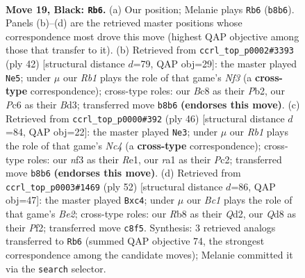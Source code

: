 \documentclass[11pt]{article}
\begin{document}
\clearpage

\begin{figure}[p]\centering
\begin{subfigure}{0.46\textwidth}\centering
\resizebox{\linewidth}{!}{%
\newchessgame
\chessboard[
  setfen={1rbqrk2/Q1p2p1p/P1pp1n2/8/2P1P3/5N2/2P2PP1/R1B2RK1 b - - 0 19},
  showmover=false,
  pgfstyle=straightmove, color=movearrow, markmove={b8-b6}
]}
\caption{}
\end{subfigure}\hfill
\begin{subfigure}{0.46\textwidth}\centering
\resizebox{\linewidth}{!}{%
\newchessgame
\chessboard[
  setfen={r4k1r/p2b1p2/2p1pn2/5p1p/3P3P/3B1Nq1/PPQ3P1/K2RR3 w - - 6 22},
  showmover=false,
  pgfstyle=straightmove, color=movearrow, markmove={f3-e5}
]}
\caption{}
\end{subfigure}
\\[4pt]
\begin{subfigure}{0.46\textwidth}\centering
\resizebox{\linewidth}{!}{%
\newchessgame
\chessboard[
  setfen={2b2r1k/pr2p2p/2p2p2/3q1p2/2NP4/2P5/P1PQ2PP/4RRK1 w - - 1 24},
  showmover=false,
  pgfstyle=straightmove, color=movearrow, markmove={c4-e3}
]}
\caption{}
\end{subfigure}\hfill
\begin{subfigure}{0.46\textwidth}\centering
\resizebox{\linewidth}{!}{%
\newchessgame
\chessboard[
  setfen={2r1r1k1/4ppbp/1q1p2p1/R2P4/1PnN4/7P/3QBPP1/3R2K1 w - - 1 27},
  showmover=false,
  pgfstyle=straightmove, color=movearrow, markmove={e2-c4}
]}
\caption{}
\end{subfigure}
\caption{\textbf{Move 19, Black: \texttt{Rb6}.} (a) Our position; Melanie plays \texttt{Rb6} (\texttt{b8b6}). Panels (b)--(d) are the retrieved master positions whose correspondence most drove this move (highest QAP objective among those that transfer to it). (b) Retrieved from \texttt{ccrl\_top\_p0002\#3393} (ply 42) [structural distance $d$=79, QAP obj=29]: the master played \texttt{Ne5}; under $\mu$ our \emph{Rb1} plays the role of that game's \emph{Nf3} (a \textbf{cross-type} correspondence); cross-type roles: our \emph{B}c8 as their \emph{P}b2, our \emph{P}c6 as their \emph{B}d3; transferred move \texttt{b8b6} \textbf{(endorses this move)}. (c) Retrieved from \texttt{ccrl\_top\_p0000\#392} (ply 46) [structural distance $d$=84, QAP obj=22]: the master played \texttt{Ne3}; under $\mu$ our \emph{Rb1} plays the role of that game's \emph{Nc4} (a \textbf{cross-type} correspondence); cross-type roles: our \emph{n}f3 as their \emph{R}e1, our \emph{r}a1 as their \emph{P}c2; transferred move \texttt{b8b6} \textbf{(endorses this move)}. (d) Retrieved from \texttt{ccrl\_top\_p0003\#1469} (ply 52) [structural distance $d$=86, QAP obj=47]: the master played \texttt{Bxc4}; under $\mu$ our \emph{Bc1} plays the role of that game's \emph{Be2}; cross-type roles: our \emph{R}b8 as their \emph{Q}d2, our \emph{Q}d8 as their \emph{P}f2; transferred move \texttt{c8f5}. Synthesis: 3 retrieved analogs transferred to \texttt{Rb6} (summed QAP objective 74, the strongest correspondence among the candidate moves); Melanie committed it via the \texttt{search} selector.}
\label{fig:thought-m37}
\end{figure}
\end{document}
